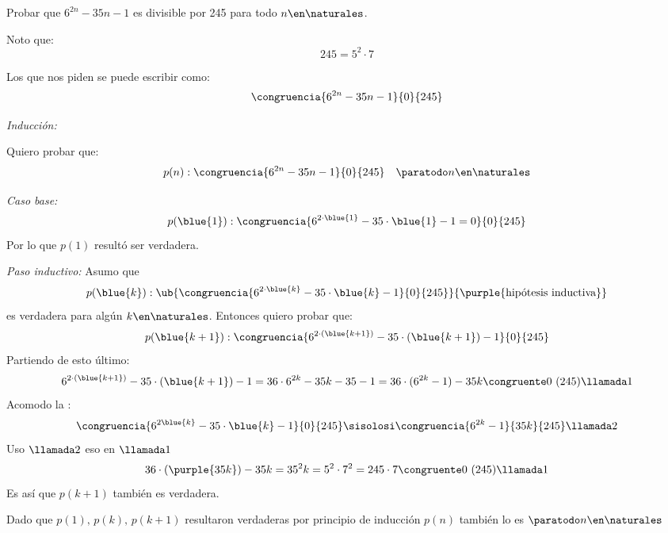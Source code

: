 \begin{enunciado}{\ejExtra}
	Probar que $6^{2n} - 35n -1$ es divisible por 245 para todo $n \en \naturales$.
\end{enunciado}

Noto que:
$$
	245 = 5^2 \cdot 7
$$

Los que nos piden se puede escribir como:
$$
	\congruencia{6^{2n} - 35n -1}{0}{245}
$$

\textit{Inducción:}

Quiero probar que:
$$
	p(n) : \congruencia{6^{2n} - 35n -1}{0}{245} \quad \paratodo n \en \naturales
$$

\textit{Caso base:}
$$
	p(\blue{1}) :
	\congruencia{
		6^{2 \cdot \blue{1}} - 35 \cdot {\blue{1}} -1 = 0 }{0}{245}
$$
Por lo que $p(1)$ resultó ser verdadera.

\textit{Paso inductivo:}
Asumo que
$$
	p(\blue{k}) : \ub{\congruencia{ 6^{2 \cdot \blue{k}} - 35 \cdot {\blue{k}} -1}{0}{245}}{\purple{\text{hipótesis inductiva}}}
$$
es verdadera para algún $k \en \naturales$. Entonces quiero probar que:
$$
	p(\blue{k+1}) : \congruencia{ 6^{2 \cdot (\blue{k+1})} - 35 \cdot ({\blue{k+1}}) -1}{0}{245}
$$
Partiendo de esto último:
$$
	6^{2 \cdot (\blue{k+1})} - 35 \cdot ({\blue{k+1}}) -1
	=
	36 \cdot 6^{2k} - 35k -35 -1
	=
	36 \cdot (6^{2k} - 1) - 35k \congruente 0 \ (245) \llamada1
$$
Acomodo la :
$$
	\congruencia{ 6^{2 \blue{k}} - 35 \cdot {\blue{k}} -1}{0}{245}
	\sisolosi
	\congruencia{ 6^{2 k} -1 }{35k}{245} \llamada2
$$
Uso $\llamada2$ eso en $\llamada1$
$$
	36 \cdot (\purple{35k}) - 35k = 35^2k = 5^2 \cdot 7^2= 245 \cdot 7 \congruente 0 \ (245) \llamada1
$$
Es así que $p(k+1)$ también es verdadera.

\bigskip

Dado que $p(1),\, p(k),\, p(k+1)$ resultaron verdaderas por principio de inducción $p(n)$ también lo es $\paratodo n \en \naturales$

\begin{aportes}
	\item {}
\end{aportes}
